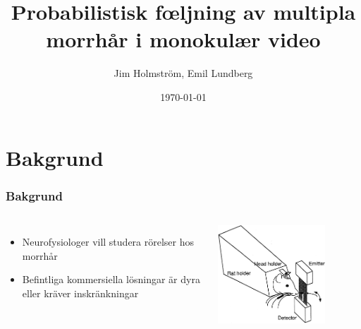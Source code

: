\documentclass[]{beamer}
\title{Probabilistisk f\oe ljning av multipla morrh\aa r i monokul\ae r video}
\author{Jim Holmstr\"{o}m, Emil Lundberg}                 %
\institute{CSC,KTH}      %
\date{\today}                    %
\renewcommand{\ae}{\"{a}}
\renewcommand{\oe}{\"{o}}
\begin{document}
\begin{frame}
  \titlepage
\end{frame}


\section{Bakgrund}
\begin{frame}
  \frametitle{Bakgrund}
  \begin{columns}[c]
    \column{2in}
    \begin{itemize}
    \item Neurofysiologer vill studera rörelser hos morrh\aa r
    \item Befintliga kommersiella l\oe sningar \ae r dyra eller kr\ae ver inskr\ae nkningar
    \end{itemize}
    \column{2in}
    \includegraphics[width=0.75\textwidth]{optoelectronic.png}
  \end{columns}
\end{frame}

\section[Agenda]{}

\begin{frame}
  \tableofcontents
\end{frame}
\end{document}
